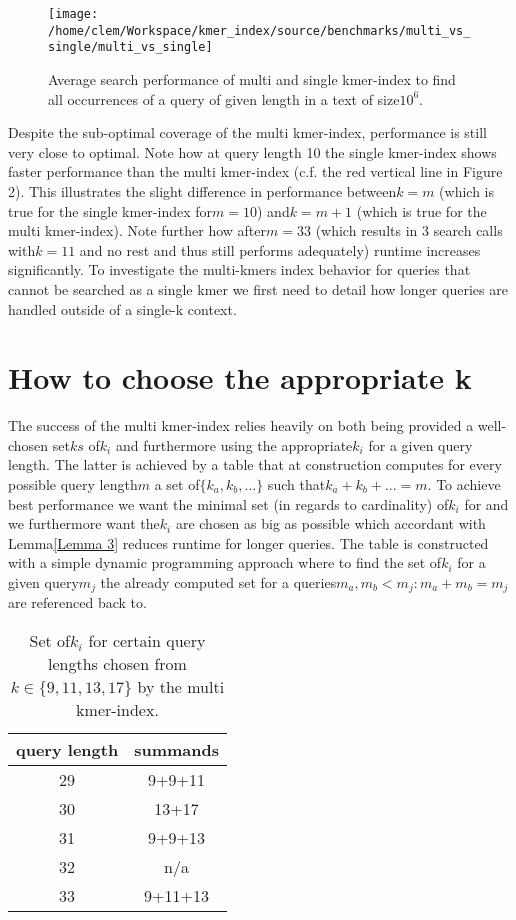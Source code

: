 \begin{figure}[H]
\texttt{[image: /home/clem/Workspace/kmer\_index/source/benchmarks/multi\_vs\_single/multi\_vs\_single]}

\caption{Average search performance of multi and single kmer-index to find
all occurrences of a query of given length in a text of size$10^{6}$.}
\end{figure}

Despite the sub-optimal coverage of the multi kmer-index, performance
is still very close to optimal. Note how at query length 10 the single
kmer-index shows faster performance than the multi kmer-index (c.f.
the red vertical line in Figure 2). This illustrates the slight difference
in performance between$k=m$ (which is true for the single kmer-index
for$m=10$) and$k=m+1$ (which is true for the multi kmer-index).
Note further how after$m=33$ (which results in 3 search calls with$k=11$
and no rest and thus still performs adequately) runtime increases
significantly. To investigate the multi-kmers index behavior for queries
that cannot be searched as a single kmer we first need to detail how
longer queries are handled outside of a single-k context.

\section{\label{section 4.2}How to choose the appropriate k}

The success of the multi kmer-index relies heavily on both being provided
a well-chosen set$ks$ of$k_{i}$ and furthermore using the appropriate$k_{i}$
for a given query length. The latter is achieved by a table that at
construction computes for every possible query length$m$ a set of$\{k_{a},k_{b},...\}$
such that$k_{a}+k_{b}+...=m$. To achieve best performance we want
the minimal set (in regards to cardinality) of$k_{i}$ for and we
furthermore want the$k_{i}$ are chosen as big as possible which accordant
with Lemma\ref{Lemma 3} reduces runtime for longer queries. The table
is constructed with a simple dynamic programming approach where to
find the set of$k_{i}$ for a given query$m_{j}$ the already computed
set for a queries$m_{a},m_{b}<m_{j}:m_{a}+m_{b}=m_{j}$ are referenced
back to.

\begin{table}[H]
\centering{}\caption{Set of$k_{i}$ for certain query lengths chosen from$k\in\{9,11,13,17\}$
by the multi kmer-index.}
\begin{tabular}{cc}
\toprule
query length & summands\tabularnewline
\midrule
\midrule
29 & 9+9+11\tabularnewline
\midrule
30 & 13+17\tabularnewline
\midrule
31 & 9+9+13\tabularnewline
\midrule
32 & n/a\tabularnewline
\midrule
33 & 9+11+13\tabularnewline
\bottomrule
\end{tabular}
\end{table}

